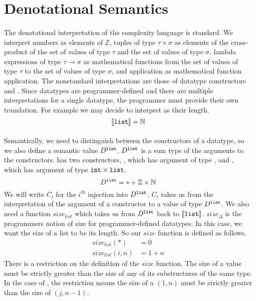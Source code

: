 \section{Denotational Semantics}

\paragraph{}
The denotational interpretation of the complexity language is standard. We
interpret numbers as elements of $\mathbb{Z}$, tuples of type $\tau \times
\sigma$ as elements of the cross-product of the set of values of type $\tau$
and the set of values of type $\sigma$, lambda expressions of type $\tau \to
\sigma$ as mathematical functions from the set of values of type $\tau$ to the
set of values of type $\sigma$, and application as mathematical function
application. The nonstandard interpretations are those of datatype constructors
and . Since datatypes are programmer-defined and there are multiple
interpretations for a single datatype, the programmer must provide their own
translation. For example we may decide to interpret  as their length.
%
\[
  \llbracket \texttt{list} \rrbracket = \mathbb{N}
\]
%
\paragraph{}
Semantically, we need to distinguish between the constructors of a datatype, so
we also define a semantic value $D^{\texttt{list}}$. $D^{\texttt{list}}$ is a sum type of the
arguments to the  constructors.  has two constructors, ,
which has argument of type , and , which has argument of type
$\texttt{int} \times \texttt{list}$.
%
\[
  D^{\texttt{list}} = \ast + \mathbb{Z} \times \mathbb{N}
\]
%
We will write $C_i$ for the $i^{th}$ injection into $D^{\texttt{list}}$. $C_i$ takes
us from the interpretation of the argument of a constructor to a value of type
$D^{\texttt{list}}$. We also need a function $size_{list}$ which takes us from
$D^{\texttt{list}}$ back to $\llbracket \texttt{list} \rrbracket$. $size_\Delta$ is the
programmers notion of size for programmer-defined datatypes. In this case, we want
the size of a list to be its length. So our $size$ function is defined as
follows.
%
\begin{align*}
  size_{list} (\ast) &= 0 \\
  size_{list}(i,n) &= 1 + n
\end{align*}
%
There is a restriction on the definition of the $size$ function. The size of a
value must be strictly greater than the size of any of its substructures of the
same type. In the case of , the restriction means the size of a $(1,
n)$ must be strictly greater than the size of $(j, n-1)$.

